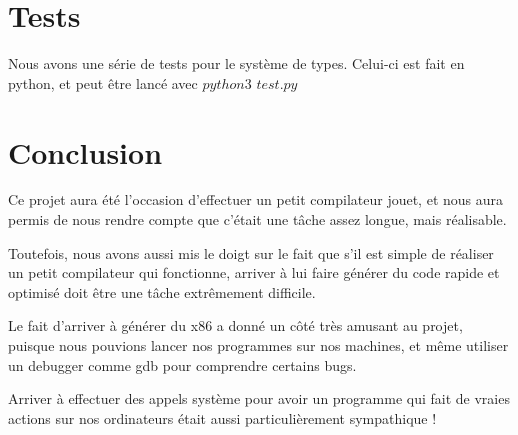 \documentclass{scrartcl}
\begin{document}
\section{Tests}

Nous avons une série de tests pour le système de types.
Celui-ci est fait en python, et peut être lancé avec $python3$ $test.py$

\section{Conclusion}

Ce projet aura été l'occasion d'effectuer un petit compilateur jouet,
et nous aura permis de nous rendre compte que c'était une tâche assez longue,
mais réalisable.

Toutefois, nous avons aussi mis le doigt sur le fait que s'il est simple
de réaliser un petit compilateur qui fonctionne, arriver à lui faire
générer du code rapide et optimisé doit être une tâche extrêmement difficile.


Le fait d'arriver à générer du x86 a donné un côté très amusant au projet,
puisque nous pouvions lancer nos programmes sur nos machines, et même
utiliser un debugger comme gdb pour comprendre certains bugs.

Arriver à effectuer des appels système pour avoir un programme qui fait
de vraies actions sur nos ordinateurs était aussi particulièrement sympathique !
\end{document}
